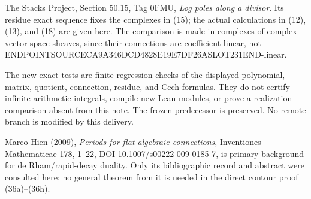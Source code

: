 The Stacks Project, Section 50.15, Tag 0FMU, \emph{Log poles along a divisor}. Its residue exact sequence fixes the complexes in (15); the actual calculations in (12), (13), and (18) are given here. The comparison is made in complexes of complex vector-space sheaves, since their connections are coefficient-linear, not ENDPOINTSOURCECA9A346DCD4828E19E7DF26ASLOT231END-linear.

The new exact tests are finite regression checks of the displayed polynomial, matrix, quotient, connection, residue, and Cech formulas. They do not certify infinite arithmetic integrals, compile new Lean modules, or prove a realization comparison absent from this note. The frozen predecessor is preserved. No remote branch is modified by this delivery.

Marco Hien (2009), \emph{Periods for flat algebraic connections}, Inventiones Mathematicae 178, 1--22, DOI 10.1007/s00222-009-0185-7, is primary background for de Rham/rapid-decay duality. Only its bibliographic record and abstract were consulted here; no general theorem from it is needed in the direct contour proof (36a)--(36h).
